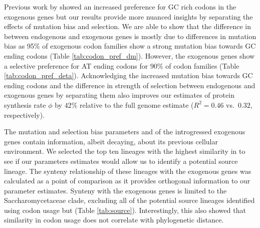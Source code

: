 \documentclass[fleqn,letterpaper]{article}
\begin{document}
Previous work by \citet{payen2009} showed an increased preference for GC rich codons in the exogenous genes but our results provide more nuanced insights by separating the effects of mutation bias and selection.
We are able to show that the difference in \GC between endogenous and exogenous genes is mostly due to differences in mutation bias as 95\% of exogenous codon families show a strong mutation bias towards GC ending codons (Table \ref{tab:codon_pref_dm}).
However, the exogenous genes show a selective preference for AT ending codons for 90\% of codon families (Table \ref{tab:codon_pref_deta}).
Acknowledging the increased mutation bias towards GC ending codons and the difference in strength of selection between endogenous and exogenous genes by separating them also improves our estimates of protein synthesis rate $\phi$ by $42 \%$ relative to the full genome estimate ($R^2 = 0.46$ vs.~$0.32$, respectively).

The mutation and selection bias parameters \DM and \DE of the introgressed exogenous genes contain information, albeit decaying, about its previous cellular environment.
We selected the top ten lineages with the highest similarity in \DM to see if our parameters estimates would allow us to identify a potential source lineage.
The synteny relationship of these lineages with the exogenous genes was calculated as a point of comparison as it provides orthogonal information to our parameter estimates.
Synteny with the exogenous genes is limited to the Saccharomycetaceae clade, excluding all of the potential source lineages identified using codon usage but \gossypii (Table \ref{tab:source}).
Interestingly, this also showed that similarity in codon usage does not correlate with phylogenetic distance.
\end{document}
